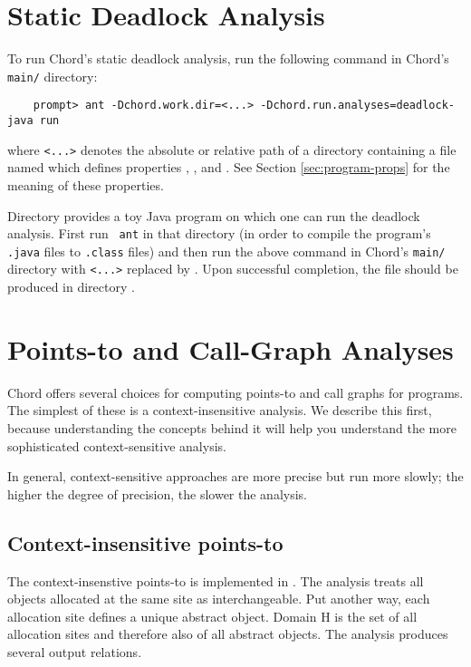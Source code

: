 \section{Static Deadlock Analysis}

To run Chord's static deadlock analysis,  run the following
command in Chord's {\tt main/} directory:

\begin{verbatim}
    prompt> ant -Dchord.work.dir=<...> -Dchord.run.analyses=deadlock-java run
\end{verbatim}

where {\tt <...>} denotes the absolute or relative path of a directory
containing a file named  which defines
properties , , and
.  See Section \ref{sec:program-props} for the
meaning of these properties.

Directory  provides a toy Java
program on which one can run the deadlock analysis.  First run {\tt
  ant} in that directory (in order to compile the program's {\tt
  .java} files to {\tt .class} files) and then run the above command
in Chord's {\tt main/} directory with {\tt <...>} replaced by
.  Upon successful completion, the
file  should be produced in directory
.

\section{Points-to and Call-Graph Analyses}

Chord offers several choices for computing points-to and call graphs for programs.
The simplest of these is a context-insensitive analysis. We describe this first,
because understanding the concepts behind it will help you understand the more
sophisticated context-sensitive analysis.

In general, context-sensitive approaches are more precise but run more slowly;
the higher the degree of precision, the slower the analysis.

\subsection{Context-insensitive points-to}

The context-insenstive points-to is implemented in .
The analysis treats all objects allocated at the same site as interchangeable.
Put another way, each allocation site defines a unique abstract object.
Domain H is the set of all allocation sites and therefore also of all abstract objects.
The analysis produces several output relations. 

